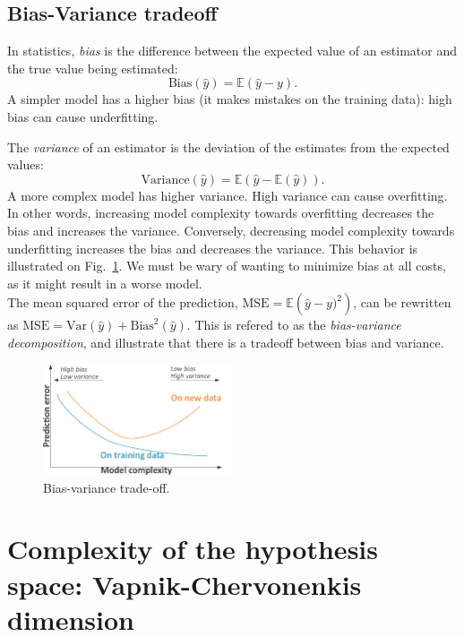 \documentclass[a4paper,12pt]{article}
\begin{document}
\subsection{Bias-Variance tradeoff}
In statistics, {\em bias} is the difference between the expected value of an estimator and the true value being estimated:
\[
\mbox{Bias}(\hat y) =  \mathbb{E}\left( \hat y - y \right).
\] 
A simpler model has a higher bias (it makes mistakes on the training data): high bias can cause underfitting.

The {\em variance} of an estimator is the deviation of the estimates from the expected values:
\[
\mbox{Variance}(\hat y) = \mathbb{E}\left( \hat y - \mathbb{E}(\hat y) \right).
\]
A more complex model has higher variance. High variance can cause overfitting.\\

In other words, increasing model complexity towards overfitting decreases the bias and increases the variance. Conversely, decreasing model complexity towards underfitting increases the bias and decreases the variance. This behavior is illustrated on Fig.~\ref{fig:bias_variance}. We must be wary of wanting to minimize bias at all costs, as it might result in a worse model.\\

The mean squared error of the prediction, $\mbox{MSE} =  \mathbb{E} \left( \hat y - y)^2 \right)$, can be rewritten as $\mbox{MSE} = \mbox{Var}(\hat y) + \mbox{Bias}^2(\hat y)$. This is refered to as the {\em bias-variance decomposition}, and illustrate that there is a tradeoff between bias and variance.

\begin{figure}[h]
  \centering
  \includegraphics[width=0.5\textwidth]{figures/bias_variance}
  \caption{Bias-variance trade-off.}
  \label{fig:bias_variance}
\end{figure}

\section{Complexity of the hypothesis space: Vapnik-Chervonenkis dimension}
\end{document}
